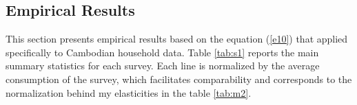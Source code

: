 \documentclass[11pt,letterpaper]{article}
\begin{document}
\begin{table}[]
\centering
\caption{Mapping model to data objects by scenario assumptions}
\label{tab:map1}

\end{table}

\subsection{Empirical Results}\label{sec:er}
This section presents empirical results based on the equation (\ref{e10}) that applied specifically to Cambodian household data. Table \ref{tab:s1} reports the main summary statistics for each survey. Each line is normalized by the average consumption of the survey, which facilitates comparability and corresponds to the normalization behind my elasticities in the table \ref{tab:m2}.
\end{document}
